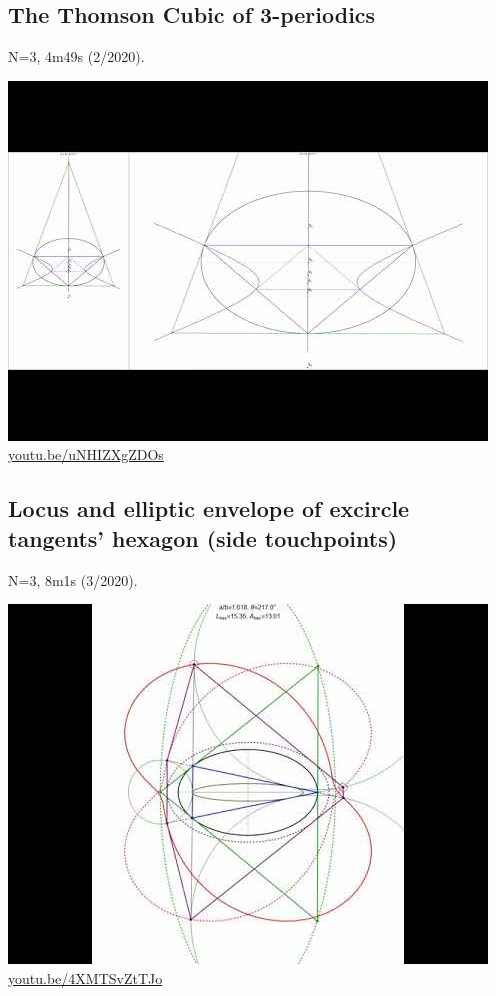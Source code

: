 \documentclass[12pt]{amsart}
\begin{document}
\subsection{The Thomson Cubic of 3-periodics}
\label{vid:uNHIZXgZDOs}
\noindent N=3, 4m49s (2/2020). 
\begin{center}\includegraphics[width=.5\textwidth]{pics/uNHIZXgZDOs.jpg} \\ 
\href{https://youtu.be/uNHIZXgZDOs}{\url{youtu.be/uNHIZXgZDOs}}\end{center}
% 

\subsection{Locus and elliptic envelope of excircle tangents' hexagon (side touchpoints)}
\label{vid:4XMTSvZtTJo}
\noindent N=3, 8m1s (3/2020). 
\begin{center}\includegraphics[width=.5\textwidth]{pics/4XMTSvZtTJo.jpg} \\ 
\href{https://youtu.be/4XMTSvZtTJo}{\url{youtu.be/4XMTSvZtTJo}}\end{center}
% 
\end{document}
